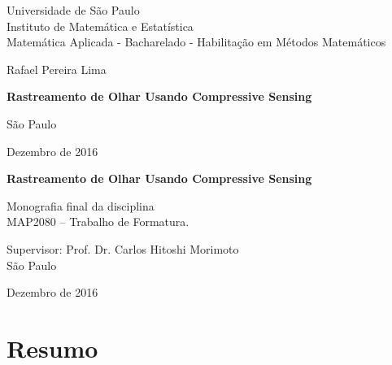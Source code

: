 \documentclass[12pt]{report}
\begin{document}
\thispagestyle{empty}
\begin{center}
    \vspace*{2.3cm}
    Universidade de São Paulo\\
    Instituto de Matemática e Estatística\\
    Matemática Aplicada - Bacharelado - Habilitação em Métodos Matemáticos


    \vspace*{3cm}
    \Large{Rafael Pereira Lima}
    

    \vspace{3cm}
    \textbf{\Large{Rastreamento de Olhar Usando Compressive Sensing}}
    
       
    \vskip 5cm
    \normalsize{São Paulo}

    \normalsize{Dezembro de 2016}
\end{center}

%
\newpage
\thispagestyle{empty}
    \begin{center}
        \vspace*{2.3 cm}
        \textbf{\Large{Rastreamento de Olhar Usando Compressive Sensing}}
        \vspace*{2 cm}
    \end{center}

    \vskip 2cm

    \begin{flushright}
	Monografia final da disciplina \\
        MAP2080 -- Trabalho de Formatura.
    \end{flushright}

    \vskip 5cm

    \begin{center}
    Supervisor: Prof. Dr. Carlos Hitoshi Morimoto\\

    \vskip 4.5cm
    \normalsize{São Paulo}
    
    \normalsize{Dezembro de 2016}
    \end{center}
\pagebreak

\chapter*{Resumo}
\end{document}
